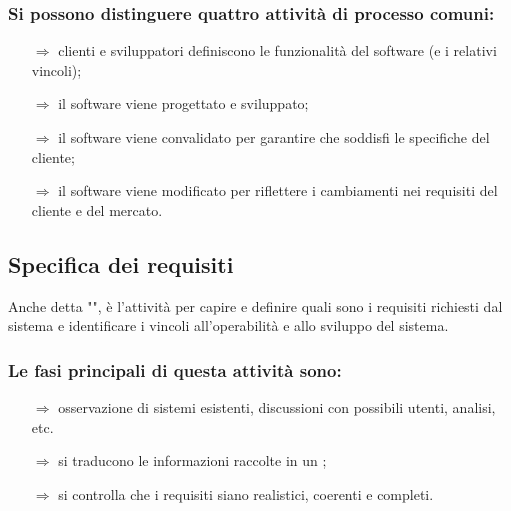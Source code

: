 
\subsubsection{Si possono distinguere quattro attività di processo comuni:}

\begin{itemize}
    \item [$\Rightarrow$]  clienti e sviluppatori
    definiscono le funzionalità del software (e i relativi vincoli);
    \item [$\Rightarrow$]  il software viene progettato e sviluppato;
    \item [$\Rightarrow$]  il software viene convalidato
    per garantire che soddisfi le specifiche del cliente;
    \item [$\Rightarrow$]  il software viene modificato
    per riflettere i cambiamenti nei requisiti del cliente e del mercato.
\end{itemize}

\subsection{Specifica dei requisiti}

Anche detta "", è l'attività per
capire e definire quali sono i requisiti richiesti dal sistema e identificare i vincoli 
all'operabilità e allo sviluppo del sistema.
\subsubsection{Le fasi principali di questa attività sono:}

\begin{itemize}
    \item [$\Rightarrow$]  
    osservazione di sistemi esistenti, discussioni con possibili utenti, analisi, etc.
    \item [$\Rightarrow$]  si traducono le informazioni raccolte in un 
    ;
    \item [$\Rightarrow$]  si controlla che i requisiti
    siano realistici, coerenti e completi.
\end{itemize}

